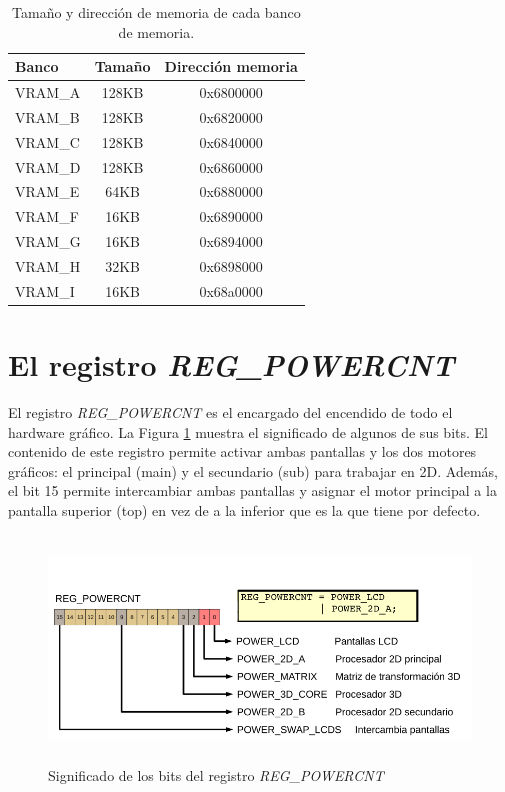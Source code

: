 \begin{table}[t]
\centering
\caption{Tamaño y dirección de memoria de cada banco de memoria.}
\begin{tabular}{|l |c | c|}
\hline
Banco & Tamaño &  Dirección memoria  \\
\hline
\hline
VRAM\_A & 128KB & 0x6800000 \\
\hline
VRAM\_B & 128KB  &	0x6820000 \\
\hline
VRAM\_C & 128KB  &	0x6840000 \\
\hline
VRAM\_D	& 128KB  &	0x6860000 \\
\hline
VRAM\_E	& 64KB  &	0x6880000\\
\hline
VRAM\_F	& 16KB  &	0x6890000 \\
\hline
VRAM\_G	& 16KB  &	0x6894000\\
\hline
VRAM\_H	& 32KB & 	0x6898000 \\
\hline
VRAM\_I	& 16KB  &	0x68a0000\\
\hline
\end{tabular}
\label{tab_c5_NivelesDeEjecución}
\end{table}

\section{El registro \textit{REG\_POWERCNT}} 
El registro \textit{REG\_POWERCNT} es el encargado del encendido de todo el hardware gráfico. La Figura \ref{c5_bits_reg_powercnt} muestra el significado de algunos de sus bits. El contenido de este registro permite activar ambas pantallas y los dos motores gráficos: el principal (main) y el secundario (sub) para trabajar en 2D. Además, el bit 15  permite intercambiar ambas pantallas y asignar  el motor principal a la pantalla superior (top) en vez de a la inferior que es la que tiene por defecto.

\begin{figure}[h]
\centering
\includegraphics[height=6cm]{Figuras/C5/c5_reg_powercnt.png}
\caption{Significado de los bits del registro \textit{REG\_POWERCNT}}
\label{c5_bits_reg_powercnt}
\end{figure}

